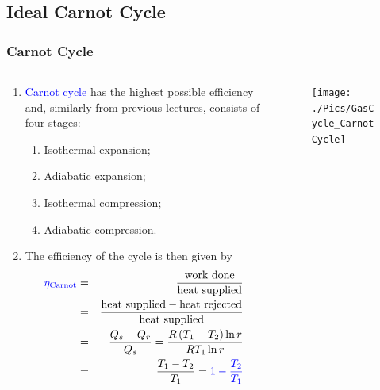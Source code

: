 \documentclass[10pt,compress]{beamer}
\newcommand{\frc}{\displaystyle\frac}
\newcommand{\blue}{\textcolor{blue}}
\begin{document}
\subsection{Ideal Carnot Cycle}
\begin{frame}
 \frametitle{Carnot Cycle}
 \begin{columns}
  \begin{column}[c]{0.45\linewidth}
   \begin{enumerate} \scriptsize
     \item \blue{Carnot cycle} has the highest possible efficiency and, similarly from previous lectures, consists of four stages:
     \begin{enumerate}\scriptsize
       \item<2-> Isothermal expansion; 
       \item<2-> Adiabatic expansion;
       \item<2-> Isothermal compression;
       \item<2-> Adiabatic compression.
     \end{enumerate}\scriptsize
     \item <3-> The efficiency of the cycle is then given by
       \begin{eqnarray}
        \textcolor{blue}{\eta_{\text{Carnot}}} &=& \displaystyle\frac{\text{work done}}{\text{heat supplied}} \nonumber\\
                         &=& \displaystyle\frac{\text{heat supplied}-\text{heat rejected}}{\text{heat supplied}} \nonumber \\
                         &=& \displaystyle\frac{Q_{s}-Q_{r}}{Q_{s}}= \displaystyle\frac{R\left(T_{1}-T_{2}\right)\ln r}{RT_{1}\ln r} \nonumber  \\
                         &=& \displaystyle\frac{T_{1}-T_{2}}{T_{1}} = \blue{1 - \frc{T_{2}}{T_{1}}}
       \end{eqnarray}
   \end{enumerate}
  \end{column}
  \begin{column}[c]{0.55\linewidth}
   \begin{figure}%
    \begin{center}
     \texttt{[image: ./Pics/GasCycle\_CarnotCycle]}
    \end{center}
   \end{figure}  
  \end{column}  
 \end{columns} 
\end{frame}
\end{document}
